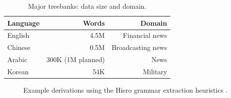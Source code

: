 \begin{table}[t]
\centering
  \begin{tabular}{l|rr}
    \hline
    Language & Words &  Domain \\ \hline
    English & 4.5M& Financial news \\
    Chinese & 0.5M & Broadcasting news \\ 
    Arabic &  300K (1M planned)  &  News  \\
    Korean & 54K  & Military \\ \hline
  \end{tabular}
\caption{Major treebanks: data size and domain.}
\label{tab:intro_treebanks}
\end{table}

\begin{figure}[t]
  \centering
\caption{Example derivations using the Hiero grammar extraction heuristics \cite{chiang07hierarchical}.}
\label{fig:intro_hiero}
\end{figure}

